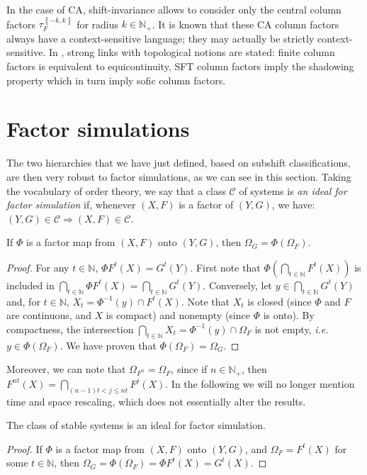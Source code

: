 \documentclass{jac}
\newcommand{\N}{\mathbb N}
\newcommand{\Ns}{\N_+}
\newcommand{\cc}[2]{\left\llbracket #1,#2\right\rrbracket}
\newcommand{\ie}{\textit{i.e.}\ }
\theoremstyle{definition}
\begin{document}
In the case of CA, shift-invariance allows to consider only the central column factors $\tau_F^{\cc{-k}k}$ for radius $k\in\Ns$.
It is known \cite{notes} that these CA column factors always have a context-sensitive language; they may actually be strictly context-sensitive. In \cite{classif}, strong links with topological notions are stated: finite column factors is equivalent to equicontinuity, SFT column factors imply the shadowing property which in turn imply sofic column factors.


\section{Factor simulations}\label{s:facsim}

The two hierarchies that we have just defined, based on subshift classifications, are then very robust to factor simulations, as we can see in this section.
Taking the vocabulary of order theory, we say that a class $\mathcal C$ of systems is \emph{an ideal for factor simulation} if, whenever $(X,F)$ is a factor of $(Y,G)$, we have: ${(Y,G)\in\mathcal C\Rightarrow(X,F)\in\mathcal C}$.

\begin{prop}\label{p:limsim}
If $\Phi$ is a factor map from $(X,F)$ onto $(Y,G)$, then $\Omega_G=\Phi(\Omega_F)$.
\end{prop}
\begin{proof}
For any $t\in\N$, $\Phi F^t(X)=G^t(Y)$.
First note that $\Phi(\bigcap_{t\in\N}F^t(X))$ is included in $\bigcap_{t\in\N}\Phi F^t(X)=\bigcap_{t\in\N}G^t(Y)$.
Conversely, let $y\in\bigcap_{t\in\N}G^t(Y)$ and, for $t\in\N$, $X_t=\Phi^{-1}(y)\cap F^t(X)$. Note that $X_t$ is closed (since $\Phi$ and $F$ are continuous, and $X$ is compact) and nonempty (since $\Phi$ is onto). By compactness, the intersection $\bigcap_{t\in\N}X_t=\Phi^{-1}(y)\cap\Omega_F$ is not empty, \ie $y\in\Phi(\Omega_F)$.
We have proven that $\Phi(\Omega_F)=\Omega_G$.
\end{proof}

Moreover, we can note that $\Omega_{F^n}=\Omega_F$, since if $n\in\Ns$, then $F^{nt}(X)=\bigcap_{(n-1)t<j\le nt}F^j(X)$.
In the following we will no longer mention time and space rescaling, which does not essentially alter the results.

\begin{cor}
 The class of stable systems is an ideal for factor simulation.
\end{cor}
\begin{proof}
If $\Phi$ is a factor map from $(X,F)$ onto $(Y,G)$, and $\Omega_F=F^t(X)$ for some $t\in\N$, then $\Omega_G=\Phi(\Omega_F)=\Phi F^t(X)=G^t(X)$.
\end{proof}
\end{document}
